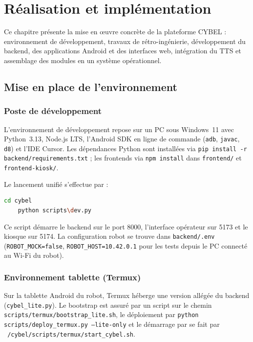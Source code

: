 \newpage
\section{Réalisation et implémentation}
\label{chap:realisation_implementation}

Ce chapitre présente la mise en \oe uvre concrète de la plateforme CYBEL :
environnement de développement, travaux de rétro-ingénierie, développement
du backend, des applications Android et des interfaces web, intégration du TTS
et assemblage des modules en un système opérationnel.


\subsection{Mise en place de l'environnement}

\subsubsection{Poste de développement}

L'environnement de développement repose sur un PC sous Windows~11 avec
Python~3.13, Node.js LTS, l'Android SDK en ligne de commande (\texttt{adb},
\texttt{javac}, \texttt{d8}) et l'IDE Cursor. Les dépendances Python sont
installées via \texttt{pip install -r backend/requirements.txt} ; les
frontends via \texttt{npm install} dans \texttt{frontend/} et
\texttt{frontend-kiosk/}.

Le lancement unifié s'effectue par :
\begin{lstlisting}[style=terminal, language=bash, caption={Commandes pour lancer l'interface contrôleur}]
    cd cybel
    python scripts\dev.py
\end{lstlisting}
Ce script démarre le backend sur le port 8000, l'interface opérateur sur
5173 et le kiosque sur 5174. La configuration robot se trouve dans
\texttt{backend/.env} (\texttt{ROBOT\_MOCK=false},
\texttt{ROBOT\_HOST=10.42.0.1} pour les tests depuis le PC connecté au
Wi-Fi du robot).

\subsubsection{Environnement tablette (Termux)}

Sur la tablette Android du robot, Termux héberge une version allégée du
backend (\texttt{cybel\_lite.py}). Le bootstrap est assuré par un script sur le chemin
\texttt{scripts/termux/bootstrap\_lite.sh}, le déploiement par
\texttt{python scripts/deploy\_termux.py --lite-only} et le démarrage par se fait par
\texttt{~/cybel/scripts/termux/start\_cybel.sh}.


